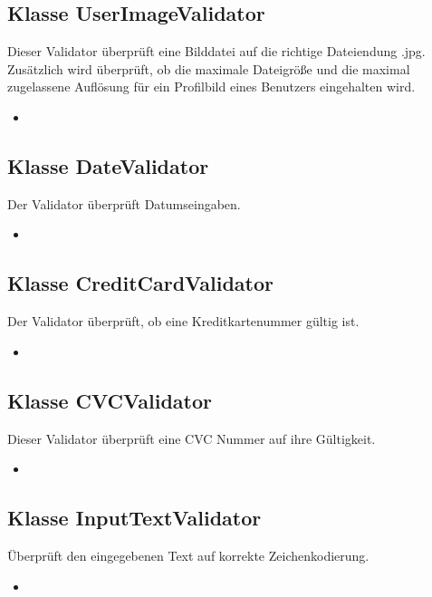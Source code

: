 	\subsection{Klasse UserImageValidator}
	Dieser Validator überprüft eine Bilddatei auf die richtige Dateiendung .jpg. Zusätzlich wird überprüft, ob
	die maximale Dateigröße und die maximal zugelassene Auflösung für ein Profilbild eines Benutzers eingehalten wird.
	\begin{itemize}
		\item \override
	\end{itemize}
	
	\subsection{Klasse DateValidator}
	Der Validator überprüft Datumseingaben.
	\begin{itemize}
		\item \override
	\end{itemize}
	
	\subsection{Klasse CreditCardValidator}
	Der Validator überprüft, ob eine Kreditkartenummer gültig ist.
	\begin{itemize}
		\item \override
	\end{itemize}
	
	\subsection{Klasse CVCValidator}
	Dieser Validator überprüft eine CVC Nummer auf ihre Gültigkeit.
	\begin{itemize}
		\item \override
	\end{itemize}
	
	\subsection{Klasse InputTextValidator}
	Überprüft den eingegebenen Text auf korrekte Zeichenkodierung.
	\begin{itemize}
		\item \override
	\end{itemize}
	
